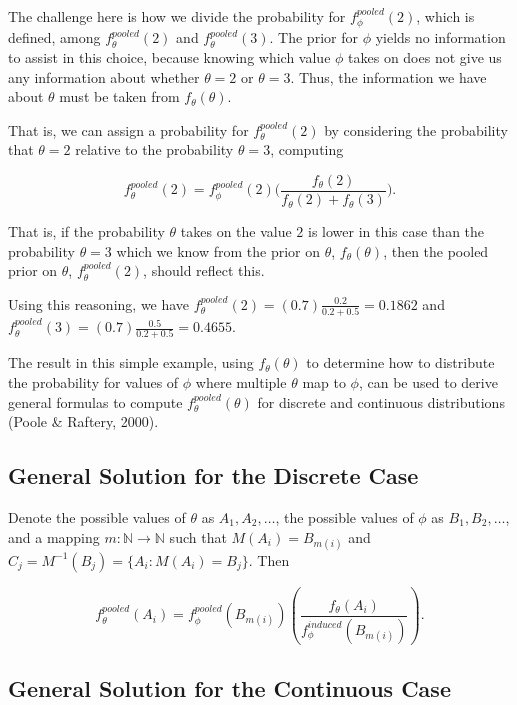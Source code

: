 \documentclass[12pt,twoside]{smiththesis}
\begin{document}
The challenge here is how we divide the probability for \(f_\phi^{pooled}(2)\), which is defined, among \(f_\theta^{pooled}(2)\) and \(f_\theta^{pooled}(3)\). The prior for \(\phi\) yields no information to assist in this choice, because knowing which value \(\phi\) takes on does not give us any information about whether \(\theta=2\) or \(\theta=3\). Thus, the information we have about \(\theta\) must be taken from \(f_\theta(\theta)\).

That is, we can assign a probability for \(f_\theta^{pooled}(2)\) by considering the probability that \(\theta = 2\) relative to the probability \(\theta =3\), computing

\[f_\theta^{pooled}(2) = f_\phi^{pooled}(2) \Big( \frac{f_\theta(2)}{f_\theta(2) + f_\theta(3)}\Big).\]

That is, if the probability \(\theta\) takes on the value \(2\) is lower in this case than the probability \(\theta=3\) which we know from the prior on \(\theta\), \(f_\theta(\theta)\), then the pooled prior on \(\theta\), \(f_\theta^{pooled}(2)\), should reflect this.

Using this reasoning, we have \(f_\theta^{pooled}(2) = (0.7) \frac{0.2}{0.2+0.5} = 0.1862\) and \(f_\theta^{pooled}(3) = (0.7) \frac{0.5}{0.2+0.5} = 0.4655\).

The result in this simple example, using \(f_\theta(\theta)\) to determine how to distribute the probability for values of \(\phi\) where multiple \(\theta\) map to \(\phi\), can be used to derive general formulas to compute \(f_\theta^{pooled}(\theta)\) for discrete and continuous distributions (Poole \& Raftery, 2000).

\hypertarget{general-solution-for-the-discrete-case}{%
\subsection{General Solution for the Discrete Case}\label{general-solution-for-the-discrete-case}}

Denote the possible values of \(\theta\) as \(A_1, A_2, \dots\), the possible values of \(\phi\) as \(B_1, B_2, \dots\), and a mapping \(m: \mathbb{N} \to \mathbb{N}\) such that \(M(A_i) = B_{m(i)}\) and \(C_j = M^{-1}(B_j) = \{A_i : M(A_i) = B_j\}\). Then

\[f_\theta^{pooled}(A_i) = f_\phi^{pooled}(B_{m(i)}) \left( \frac{f_\theta(A_i)}{f_\phi^{induced}(B_{m(i)})} \right).\]

\hypertarget{general-solution-for-the-continuous-case}{%
\subsection{General Solution for the Continuous Case}\label{general-solution-for-the-continuous-case}}
\end{document}
